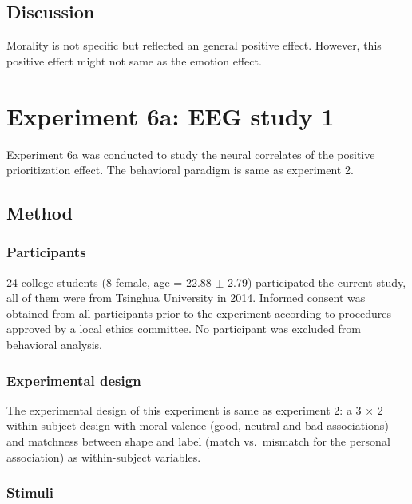 \documentclass[
  english,
  man]{apa6}
\begin{document}
\hypertarget{discussion-5}{%
\subsection{Discussion}\label{discussion-5}}

Morality is not specific but reflected an general positive effect. However, this positive effect might not same as the emotion effect.

\hypertarget{experiment-6a-eeg-study-1}{%
\section{Experiment 6a: EEG study 1}\label{experiment-6a-eeg-study-1}}

Experiment 6a was conducted to study the neural correlates of the positive prioritization effect. The behavioral paradigm is same as experiment 2.

\hypertarget{method-7}{%
\subsection{Method}\label{method-7}}

\hypertarget{participants-9}{%
\subsubsection{Participants}\label{participants-9}}

24 college students (8 female, age = 22.88 \(\pm\) 2.79) participated the current study, all of them were from Tsinghua University in 2014. Informed consent was obtained from all participants prior to the experiment according to procedures approved by a local ethics committee. No participant was excluded from behavioral analysis.

\hypertarget{experimental-design-3}{%
\subsubsection{Experimental design}\label{experimental-design-3}}

The experimental design of this experiment is same as experiment 2: a 3 × 2 within-subject design with moral valence (good, neutral and bad associations) and matchness between shape and label (match vs.~mismatch for the personal association) as within-subject variables.

\hypertarget{stimuli-4}{%
\subsubsection{Stimuli}\label{stimuli-4}}
\end{document}
